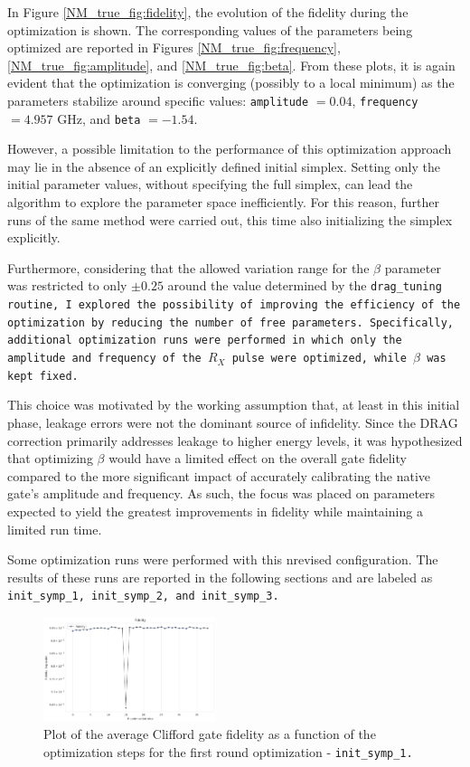 In Figure \ref{NM_true_fig:fidelity}, the evolution of the fidelity during the optimization is shown. 
The corresponding values of the parameters being optimized are reported in Figures \ref{NM_true_fig:frequency}, \ref{NM_true_fig:amplitude}, and \ref{NM_true_fig:beta}. 
From these plots, it is again evident that the optimization is converging (possibly to a local minimum) as the parameters stabilize around specific values: \texttt{amplitude} $= 0.04$, \texttt{frequency} $= 4.957$ GHz, and \texttt{beta} $= -1.54$.

However, a possible limitation to the performance of this optimization approach may lie in the absence of an explicitly defined initial simplex.
Setting only the initial parameter values, without specifying the full simplex, can lead the algorithm to explore the parameter space inefficiently. 
For this reason, further runs of the same method were carried out, this time also initializing the simplex explicitly.

Furthermore, considering that the allowed variation range for the $\beta$ parameter was restricted to only $\pm0.25$ around the value determined by the \tt{drag\_tuning} routine, I explored the possibility of improving the efficiency of the optimization by reducing the number of free parameters. 
Specifically, additional optimization runs were performed in which only the amplitude and frequency of the $R_X$ pulse were optimized, while $\beta$ was kept fixed.

This choice was motivated by the working assumption that, at least in this initial phase, leakage errors were not the dominant source of infidelity. 
Since the DRAG correction primarily addresses leakage to higher energy levels, it was hypothesized that optimizing $\beta$ would have a limited effect on the overall gate fidelity compared to the more significant impact of accurately calibrating the native gate's amplitude and frequency. 
As such, the focus was placed on parameters expected to yield the greatest improvements in fidelity while maintaining a limited run time.

Some optimization runs were performed with this nrevised configuration.
The results of these runs are reported in the following sections and are labeled as \tt{init\_symp\_1}, \tt{init\_symp\_2}, and \tt{init\_symp\_3}.

\begin{figure}
    \centering
    \includegraphics[width=0.45\textwidth]{figures/png/RB_optimization/NM/InitialSymplex/20241110_211211/fidelity.png}
    \caption{Plot of the average Clifford gate fidelity as a function of the optimization steps for the first round optimization - \tt{init\_symp\_1}.}
    \label{fig:20241110_211211:fidelity}
\end{figure}

